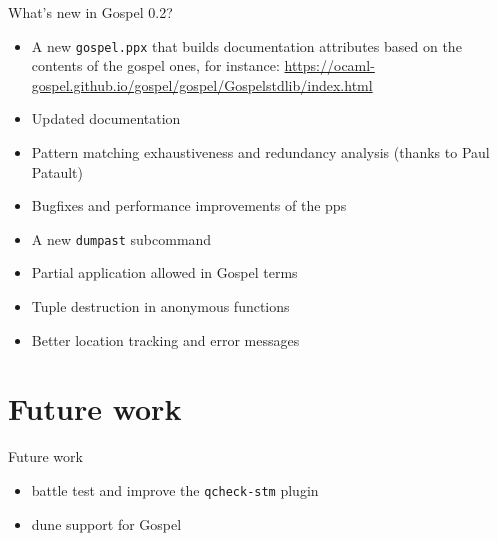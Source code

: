 \documentclass[pdf]{beamer}
\begin{document}
\begin{frame}{What's new in Gospel 0.2?}

  \begin{itemize}

    \item A new \texttt{gospel.ppx} that builds documentation attributes based on the contents of the gospel ones, for instance:
    \url{https://ocaml-gospel.github.io/gospel/gospel/Gospelstdlib/index.html}
    \item Updated documentation
    \item Pattern matching exhaustiveness and redundancy analysis (thanks to Paul Patault)
    \item Bugfixes and performance improvements of the pps
    \item A new \texttt{dumpast} subcommand
    \item Partial application allowed in Gospel terms
    \item Tuple destruction in anonymous functions
    \item Better location tracking and error messages
  \end{itemize}

\end{frame}

\section{Future work}

\begin{frame}{Future work}

  \begin{itemize}
    \item battle test and improve the \texttt{qcheck-stm} plugin
    \item dune support for Gospel
  \end{itemize}

\end{frame}
\end{document}
